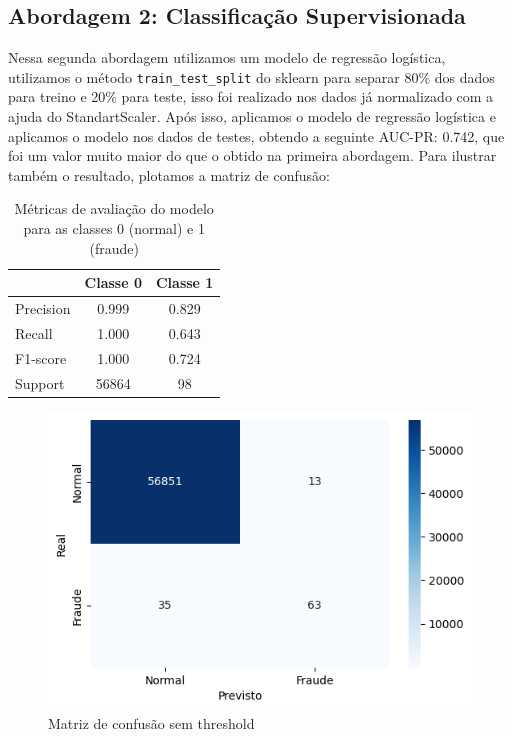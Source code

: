 \documentclass[conference]{IEEEtran}
\begin{document}
\subsection{Abordagem 2: Classificação Supervisionada}
\label{subsec:abordagem2}
  Nessa segunda abordagem utilizamos um modelo de regressão logística, utilizamos o método \texttt{train\_test\_split} do sklearn para separar 80\% dos dados para treino e 20\% para teste, isso foi realizado nos dados já normalizado com a ajuda do StandartScaler. Após isso, aplicamos o modelo de regressão logística e aplicamos o modelo nos dados de testes, obtendo a seguinte AUC-PR: 0.742, que foi um valor muito maior do que o obtido na primeira abordagem. Para ilustrar também o resultado, plotamos a matriz de confusão:
\begin{table}[H]
    \caption{Métricas de avaliação do modelo para as classes 0 (normal) e 1 (fraude)}
    \label{tab:metricas_classificacao}
    \centering
    \begin{tabular}{lcc}
        \toprule
        & \textbf{Classe 0} & \textbf{Classe 1} \\
        \midrule
        Precision   & 0.999 & 0.829 \\
        Recall      & 1.000 & 0.643 \\ 
        F1-score    & 1.000 & 0.724 \\
        Support     & 56864 & 98 \\
        \bottomrule
    \end{tabular}
\end{table}
  \begin{figure}[H]
    \centerline{\includegraphics[width=0.8\linewidth]{../output/matriz de confusao sem threshold regressao logistica.png}}
    \caption{Matriz de confusão sem threshold}
    \label{fig:matriz_confusao_regressao_logistica}
  \end{figure}
\end{document}
